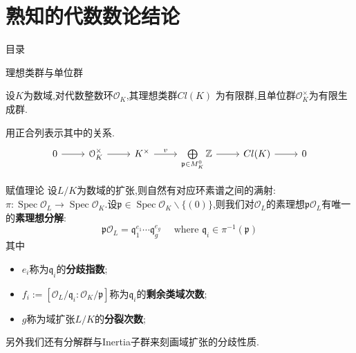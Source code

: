 \documentclass[pdf]{beamer}
\numberwithin{equation}{section}
\theoremstyle{plain}
\theoremstyle{plain}
\theoremstyle{plain}
\theoremstyle{remark}
\newcommand{\Spec}{\operatorname{Spec}}
\begin{document}
\section{熟知的代数数论结论}
\begin{frame}{目录}
\tableofcontents[currentsection]
\end{frame}
\begin{frame}[fragile]{理想类群与单位群}
\begin{theorem}\label{thm:idealclass}
	\hspace*{20pt}设$K$为数域,对代数整数环$\mathcal{O}_K$,其理想类群$Cl(K)$
	为有限群,且单位群$\mathcal{O}_K^{\times}$为有限生成群.
\end{theorem}	
	用正合列表示其中的关系.
	\begin{equation*}\label{eq:exactAN}
	\begin{tikzcd}
	0 \arrow[r] & \mathcal{O}_K^{\times} \arrow[r] & K^{\times} \arrow[r, "v"] & \bigoplus\limits_{\mathfrak{p} \in M_K^{0}}\mathbb{Z} \arrow[r] & Cl(K) \arrow[r] & 0
	\end{tikzcd}	
	\end{equation*}
	

\end{frame}
\begin{frame}{赋值理论}
\hspace*{20pt}设$L/K$为数域的扩张,则自然有对应环素谱之间的满射:$\pi:\Spec \mathcal{O}_L \longrightarrow \Spec \mathcal{O}_K$.设$\mathfrak{p} \in \Spec \mathcal{O}_K\smallsetminus \{(0)\}$,则我们对$\mathcal{O}_L$的素理想$\mathfrak{p}\mathcal{O}_L$有唯一的\textbf{素理想分解}:
$$\mathfrak{p}\mathcal{O}_L = \mathfrak{q}_1^{e_1}\cdots\mathfrak{q}_g^{e_g} \quad\text{ where } \mathfrak{q}_i \in \pi^{-1}(\mathfrak{p})$$
其中
\begin{itemize}
	\item $e_i$称为$\mathfrak{q}_i$的\textbf{分歧指数};
	\item $f_i:=[\mathcal{O}_L/\mathfrak{q}_i:\mathcal{O}_K/\mathfrak{p}]$称为$\mathfrak{q}_i$的\textbf{剩余类域次数};
	\item $g$称为域扩张$L/K$的\textbf{分裂次数};
\end{itemize}
另外我们还有分解群与Inertia子群来刻画域扩张的分歧性质.

\end{frame}
\end{document}
